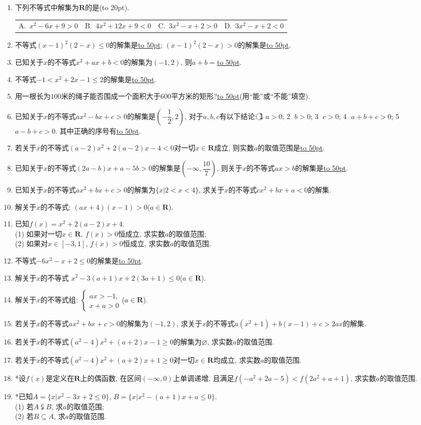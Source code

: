 \documentclass[10pt,a4paper]{article}
\newcommand{\blank}[1]{\underline{\hbox to #1pt{}}}
\newcommand{\bracket}[1]{(\hbox to #1pt{})}
\newcommand{\fourch}[4]{\par\begin{tabular}{p{.23\textwidth}p{.23\textwidth}p{.23\textwidth}p{.23\textwidth}}
A.~#1 &B.~#2& C.~#3& D.~#4
\end{tabular}}
\begin{document}
\begin{enumerate}[1.]
\item 下列不等式中解集为$\mathbf{R}$的是\bracket{20}.
\fourch{$x^2-6x+9>0$}{$4x^2+12x+9<0$}{$3x^2-x+2>0$}{$3x^2-x+2<0$}
\item 不等式$(x-1)^2(2-x)\le 0$的解集是\blank{50}; $(x-1)^2(2-x)>0$的解集是\blank{50}.
\item 已知关于$x$的不等式$x^2+ax+b<0$的解集为$(-1,2)$, 则$a+b=$\blank{50}.
\item 不等式$-1<x^2+2x-1\le 2$的解集是\blank{50}.
\item 用一根长为$100$米的绳子能否围成一个面积大于$600$平方米的矩形?\blank{50}(用``能''或``不能''填空).
\item 已知关于$x$的不等式$ax^2-bx+c>0$的解集是$(-\dfrac 12,2)$, 对于$a,b,c$有以下结论: \textcircled{1} $a>0$; \textcircled{2} $b>0$; \textcircled{3} $c>0$; \textcircled{4} $a+b+c>0$; \textcircled{5} $a-b+c>0$. 其中正确的序号有\blank{50}.
\item 若关于$x$的不等式$(a-2)x^2+2(a-2)x-4<0$对一切$x\in \mathbf{R}$成立, 则实数$a$的取值范围是\blank{50}.
\item 已知关于$x$的不等式$(2a-b)x+a-5b>0$的解集是$(-\infty,\dfrac{10}7)$, 则关于$x$的不等式$ax>b$的解集是\blank{50}.
\item 已知关于$x$的不等式$ax^2+bx+c>0$的解集为$\{x|2<x<4\}$, 求关于$x$的不等式$cx^2+bx+a<0$的解集.
\item 解关于$x$的不等式: $(ax+4)(x-1)>0$($a\in \mathbf{R}$).
\item 已知$f(x)=x^2+2(a-2)x+4$.\\
(1) 如果对一切$x\in \mathbf{R}$, $f(x)>0$恒成立, 求实数$a$的取值范围;\\
(2) 如果对$x\in [-3,1]$, $f(x)>0$恒成立, 求实数$a$的取值范围.
\item 不等式$-6x^2-x+2\le 0$的解集是\blank{50}.
\item 解关于$x$的不等式 $x^2-3(a+1)x+2(3a+1)\le 0$($a\in \mathbf{R}$).
\item 解关于$x$的不等式组: $\begin{cases} ax>-1, \\ x+a>0 \end{cases}$($a\in \mathbf{R}$).
\item 若关于$x$的不等式$ax^2+bx+c>0$的解集为$(-1,2)$, 求关于$x$的不等式$a(x^2+1)+b(x-1)+c>2ax$的解集.
\item 若关于$x$的不等式$(a^2-4)x^2+(a+2)x-1\ge 0$的解集为$\varnothing$, 求实数$a$的取值范围.
\item 若关于$x$的不等式$(a^2-4)x^2+(a+2)x+1\ge 0$对一切$x\in \mathbf{R}$均成立, 求实数$a$的取值范围.
\item *设$f(x)$是定义在$\mathbf{R}$上的偶函数, 在区间$(-\infty ,0)$上单调递增, 且满足$f(-a^2+2a-5)<f(2a^2+a+1)$, 求实数$a$的取值范围.
\item *已知$A=\{x|x^2-3x+2\le 0\}$, $B=\{x|x^2-(a+1)x+a\le 0\}$.\\ (1) 若$A\subsetneqq B$, 求$a$的取值范围;\\
(2) 若$B\subseteq A$, 求$a$的取值范围.


\end{enumerate}
\end{document}
